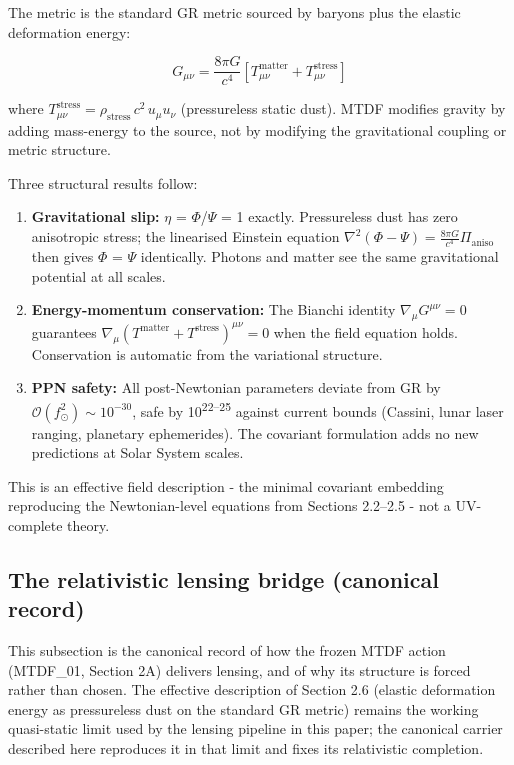 \documentclass[11pt,a4paper]{article}
\begin{document}
The metric is the standard GR metric sourced by baryons plus the elastic deformation energy:

\[ G_{\mu\nu} = \frac{8\pi G}{c^4}\left[T^{\mathrm{matter}}_{\mu\nu} + T^{\mathrm{stress}}_{\mu\nu}\right] \]

where \(T^{\mathrm{stress}}_{\mu\nu} = \rho_{\mathrm{stress}}\,c^2\,u_\mu u_\nu\) (pressureless static dust). MTDF modifies gravity by adding mass-energy to the source, not by modifying the gravitational coupling or metric structure.

Three structural results follow:

\begin{enumerate}
  \item \textbf{Gravitational slip:} $\eta$ = $\Phi$/$\Psi$ = 1 exactly. Pressureless dust has zero anisotropic stress; the linearised Einstein equation \(\nabla^2(\Phi - \Psi) = \frac{8\pi G}{c^4}\Pi_{\mathrm{aniso}}\) then gives $\Phi$ = $\Psi$ identically. Photons and matter see the same gravitational potential at all scales.
  \item \textbf{Energy-momentum conservation:} The Bianchi identity \(\nabla_\mu G^{\mu\nu} = 0\) guarantees \(\nabla_\mu(T^{\mathrm{matter}} + T^{\mathrm{stress}})^{\mu\nu} = 0\) when the field equation holds. Conservation is automatic from the variational structure.
  \item \textbf{PPN safety:} All post-Newtonian parameters deviate from GR by \(\mathcal{O}(f_\odot^2) \sim 10^{-30}\), safe by 10\textsuperscript{22--25} against current bounds (Cassini, lunar laser ranging, planetary ephemerides). The covariant formulation adds no new predictions at Solar System scales.
\end{enumerate}

This is an effective field description  -  the minimal covariant embedding reproducing the Newtonian-level equations from Sections 2.2--2.5  -  not a UV-complete theory.

\subsection{The relativistic lensing bridge (canonical record)}
This subsection is the canonical record of how the frozen MTDF action (MTDF\_\allowbreak{}01, Section 2A) delivers lensing, and of why its structure is forced rather than chosen. The effective description of Section 2.6 (elastic deformation energy as pressureless dust on the standard GR metric) remains the working quasi-static limit used by the lensing pipeline in this paper; the canonical carrier described here reproduces it in that limit and fixes its relativistic completion.
\end{document}
